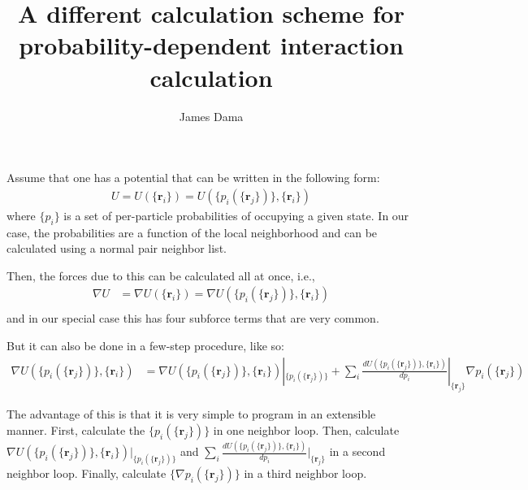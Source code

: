 \documentclass[11pt, oneside]{article}   	%
\title{A different calculation scheme for probability-dependent interaction calculation}
\author{James Dama}
\begin{document}
\maketitle

Assume that one has a potential that can be written in the following form:
\begin{align}
U =  U(\{\mathbf{r}_i\}) = U(\{p_i(\{\mathbf{r}_j\})\}, \{\mathbf{r}_i\})
\end{align}
where $\{p_i\}$ is a set of per-particle probabilities of occupying a given state. In our case, the probabilities are a function of the local neighborhood and can be calculated using a normal pair neighbor list.

Then, the forces due to this can be calculated all at once, i.e., 
\begin{align}
\nabla U &=  \nabla U(\{\mathbf{r}_i\}) = \nabla U(\{p_i(\{\mathbf{r}_j\})\}, \{\mathbf{r}_i\}) \\
\end{align}
and in our special case this has four subforce terms that are very common. 

But it can also be done in a few-step procedure, like so:
\begin{align}
\nabla U(\{p_i(\{\mathbf{r}_j\})\}, \{\mathbf{r}_i\}) &= \nabla U(\{p_i(\{\mathbf{r}_j\})\}, \{\mathbf{r}_i\}) |_{\{p_i(\{\mathbf{r}_j\})\}} + \sum_i \frac{d U(\{p_i(\{\mathbf{r}_j\})\}, \{\mathbf{r}_i\})}{d p_i} |_{\{\mathbf{r}_j\}} \nabla p_i(\{\mathbf{r}_j\})
\end{align}

The advantage of this is that it is very simple to program in an extensible manner. First, calculate the $\{p_i(\{\mathbf{r}_j\})\}$ in one neighbor loop. Then, calculate $\nabla U(\{p_i(\{\mathbf{r}_j\})\}, \{\mathbf{r}_i\}) |_{\{p_i(\{\mathbf{r}_j\})\}}$ and $\sum_i \frac{d U(\{p_i(\{\mathbf{r}_j\})\}, \{\mathbf{r}_i\})}{d p_i} |_{\{\mathbf{r}_j\}}$ in a second neighbor loop. Finally, calculate $\{ \nabla p_i(\{\mathbf{r}_j\}) \}$ in a third neighbor loop.
\end{document}

